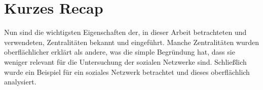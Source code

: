 \section{Kurzes Recap}
Nun sind die wichtigsten Eigenschaften der, in dieser Arbeit betrachteten und verwendeten, Zentralitäten bekannt und eingeführt. Manche Zentralitäten wurden oberflächlicher erklärt als andere, was die simple Begründung hat, dass sie weniger relevant für die Untersuchung der sozialen Netzwerke sind. Schließlich wurde ein Beispiel für ein soziales Netzwerk betrachtet und dieses oberflächlich analysiert.

